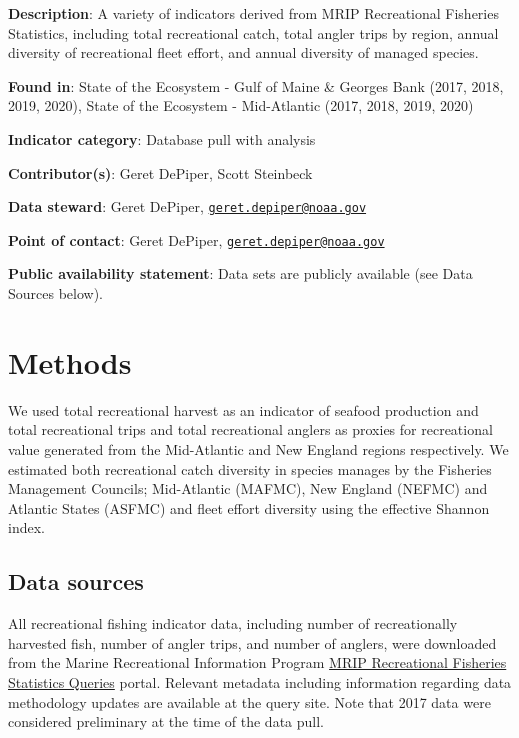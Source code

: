 \documentclass[
]{book}
\begin{document}
\textbf{Description}: A variety of indicators derived from MRIP Recreational Fisheries Statistics, including total recreational catch, total angler trips by region, annual diversity of recreational fleet effort, and annual diversity of managed species.

\textbf{Found in}: State of the Ecosystem - Gulf of Maine \& Georges Bank (2017, 2018, 2019, 2020), State of the Ecosystem - Mid-Atlantic (2017, 2018, 2019, 2020)

\textbf{Indicator category}: Database pull with analysis

\textbf{Contributor(s)}: Geret DePiper, Scott Steinbeck

\textbf{Data steward}: Geret DePiper, \href{mailto:geret.depiper@noaa.gov}{\nolinkurl{geret.depiper@noaa.gov}}

\textbf{Point of contact}: Geret DePiper, \href{mailto:geret.depiper@noaa.gov}{\nolinkurl{geret.depiper@noaa.gov}}

\textbf{Public availability statement}: Data sets are publicly available (see Data Sources below).

\hypertarget{methods-30}{%
\section{Methods}\label{methods-30}}

We used total recreational harvest as an indicator of seafood production and total recreational trips and total recreational anglers as proxies for recreational value generated from the Mid-Atlantic and New England regions respectively. We estimated both recreational catch diversity in species manages by the Fisheries Management Councils; Mid-Atlantic (MAFMC), New England (NEFMC) and Atlantic States (ASFMC) and fleet effort diversity using the effective Shannon index.

\hypertarget{data-sources-30}{%
\subsection{Data sources}\label{data-sources-30}}

All recreational fishing indicator data, including number of recreationally harvested fish, number of angler trips, and number of anglers, were downloaded from the Marine Recreational Information Program \href{https://www.st.nmfs.noaa.gov/recreational-fisheries/data-and-documentation/queries/index}{MRIP Recreational Fisheries Statistics Queries} portal. Relevant metadata including information regarding data methodology updates are available at the query site. Note that 2017 data were considered preliminary at the time of the data pull.
\end{document}
